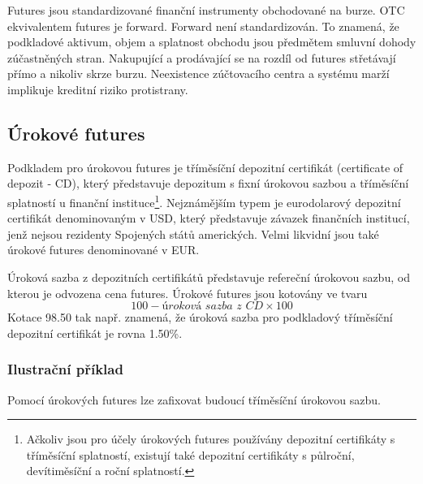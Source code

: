 \documentclass[a4paper]{book}
\begin{document}
Futures jsou standardizované finanční instrumenty obchodované na burze. OTC ekvivalentem futures je forward. Forward není standardizován. To znamená, že podkladové aktivum, objem a splatnost obchodu jsou předmětem smluvní dohody zúčastněných stran. Nakupující a prodávající se na rozdíl od futures střetávají přímo a nikoliv skrze burzu. Neexistence zúčtovacího centra a systému marží implikuje kreditní riziko protistrany.

\subsection{Úrokové futures}

Podkladem pro úrokovou futures je tříměsíční depozitní certifikát (certificate of depozit - CD), který představuje depozitum s fixní úrokovou sazbou a tříměsíční splatností u finanční instituce\footnote{Ačkoliv jsou pro účely úrokových futures používány depozitní certifikáty s tříměsíční splatností, existují také depozitní certifikáty s půlroční, devítiměsíční a roční splatností.}. Nejznámějším typem je eurodolarový depozitní certifikát denominovaným v USD, který představuje závazek finančních institucí, jenž nejsou rezidenty Spojených států amerických. Velmi likvidní jsou také úrokové futures denominované v EUR.

Úroková sazba z depozitních certifikátů představuje refereční úrokovou sazbu, od kterou je odvozena cena futures. Úrokové futures jsou kotovány ve tvaru
\begin{equation*}
100 - \textit{\'{u}roková sazba z CD} \times 100
\end{equation*}
Kotace 98.50 tak např. znamená, že úroková sazba pro podkladový tříměsíční depozitní certifikát je rovna 1.50\%.

\subsubsection{Ilustrační příklad}

Pomocí úrokových futures lze zafixovat budoucí tříměsíční úrokovou sazbu.
\end{document}
